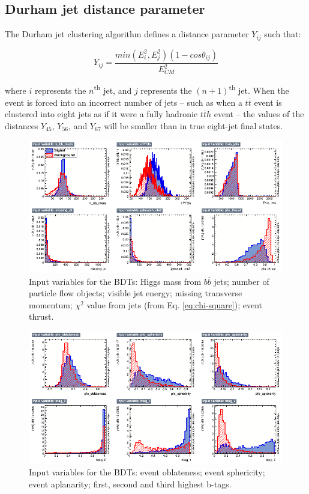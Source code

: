 \subsection{Durham jet distance parameter}
\label{section:durham-distance}
The Durham jet clustering algorithm defines a distance parameter $Y_{ij}$ such that:

\begin{equation}
	Y_{ij} = \frac{min(E_i^2 , E_j^2)(1-cos\theta_{ij})}{E^2_{CM}}
\label{eq:durham-distance}
\end{equation}

where $i$ represents the $n$\textsuperscript{th} jet, and $j$ represents the $(n+1)$\textsuperscript{th} jet. When the event is forced into an incorrect number of jets -- such as when a $t\overline{t}$ event is clustered into eight jets as if it were a fully hadronic $t\overline{t}h$ event -- the values of the distances $Y_{45}$, $Y_{56}$, and $Y_{67}$ will be smaller than in true eight-jet final states. \\

\begin{figure}[p]
	\centering
	\includegraphics[width=1.0\textwidth]{../Pictures/Analysis/BDTs/variables_id_c1.png}
	\caption{Input variables for the BDTs: Higgs mass from $b\overline{b}$ jets; number of particle flow objects; visible jet energy; missing transverse momentum; $\chi^2$ value from jets (from Eq. \ref{eq:chi-square}); event thrust.}
	\label{figure:analysis/results/tmva-inputs-1}
\end{figure}

\begin{figure}[p]
	\centering
	\includegraphics[width=1.0\textwidth]{../Pictures/Analysis/BDTs/variables_id_c2.png}
	\caption{Input variables for the BDTs: event oblateness; event sphericity; event aplanarity; first, second and third highest b-tags.}
	\label{figure:analysis/results/tmva-inputs-2}
\end{figure}

